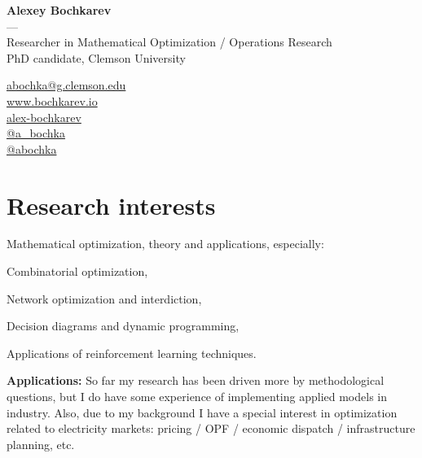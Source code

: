 \documentclass[11pt]{article} \usepackage{geometry} %
\begin{document}
  \begin{minipage}[c]{0.74\textwidth}
    \centering
    {\LARGE \textbf{Alexey Bochkarev}}\\
    ---\\ 
    Researcher in Mathematical Optimization / Operations Research\\
    PhD candidate, Clemson University
  \end{minipage}\hfill%
  \begin{minipage}{0.26\textwidth}
    \faEnvelope \href{mailto:abochka@g.clemson.edu}{abochka@g.clemson.edu}\\
    \faGlobe \href{https://www.bochkarev.io}{www.bochkarev.io}\\
    \faGithub \href{https://github.com/alex-bochkarev}{alex-bochkarev}\\
    \faTwitter \href{https://twitter.com/a_bochka}{@a\_bochka}\\
    \faTelegram \href{https://t.me/abochka}{@abochka}
  \end{minipage}
  
  \vspace{1.0em}
  \section*{Research interests}
  Mathematical optimization, theory and applications, especially:\vspace{0.3em}
  \begin{itemize}
    \begin{minipage}{0.5\linewidth}
      \item Combinatorial optimization,
      \item Network optimization and interdiction,
    \end{minipage}
    \begin{minipage}{0.5\linewidth}
      \item Decision diagrams and dynamic programming,
      \item Applications of reinforcement learning techniques.
    \end{minipage}
  \end{itemize}

  \noindent
  \textbf{Applications:} So far my research has been driven more by
  methodological questions, but I do have some experience of
  implementing applied models in industry. Also, due to my background I have a
  special interest in optimization related to electricity markets:
  pricing / OPF / economic dispatch / infrastructure planning, etc.\vspace{0.5em}
\end{document}
